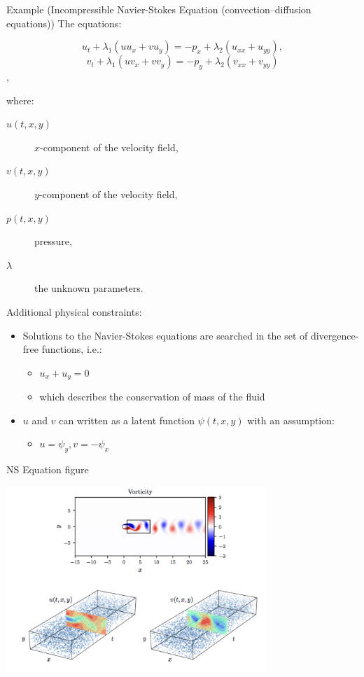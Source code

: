 \documentclass[aspectratio=1610,xcolor={dvipsnames},hyperref={colorlinks,unicode,linkcolor=violet,anchorcolor=BlueViolet,citecolor=YellowOrange,filecolor=black,urlcolor=Aquamarine}]{beamer}
\begin{document}
\begin{frame}[allowframebreaks]{Example (Incompressible Navier-Stokes Equation (convection–diffusion equations))}
The equations:

\[u_t + \lambda_1 (u u_x + v u_y) = -p_x + \lambda_2(u_{xx} + u_{yy}),\]
\[v_t + \lambda_1 (u v_x + v v_y) = -p_y + \lambda_2(v_{xx} + v_{yy})\],

where:
\begin{description}
\item[{\(u(t, x, y)\)}] \(x\)-component of the velocity field,
\item[{\(v(t, x, y)\)}] \(y\)-component of the velocity field,
\item[{\(p(t, x, y)\)}] pressure,
\item[{\(\lambda\)}] the unknown parameters.
\end{description}

Additional physical constraints:

\begin{itemize}
\item Solutions to the Navier-Stokes equations are searched in the set of divergence-free functions, i.e.:
\begin{itemize}
\item \(u_{x} + u_{y} = 0\)
\item which describes the conservation of mass of the fluid
\end{itemize}
\item \(u\) and \(v\) can written as a latent function \(\psi(t, x, y)\) with an assumption:
\begin{itemize}
\item \(u = \psi_{y}, v = -\psi_{x}\)
\end{itemize}
\end{itemize}
\end{frame}

\begin{frame}[label={sec:org61a3fcd}]{NS Equation figure}
\begin{center}
\includegraphics[height=7cm]{./p8.png}
\end{center}
\end{frame}
\end{document}
